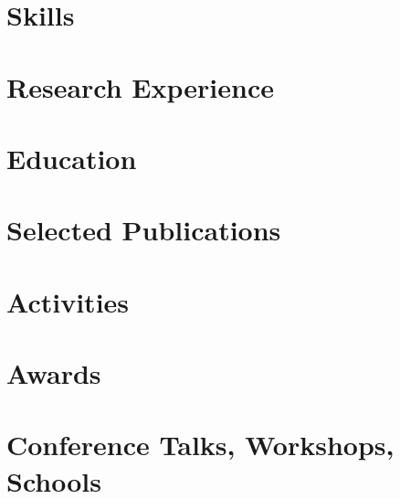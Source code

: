 \documentclass[letter,10pt]{article}
\begin{document}


\section{Skills}


\section{Research Experience}


\newpage

\section{Education}



\section{Selected Publications}


\section{Activities}


\section{Awards}


\section{Conference Talks, Workshops, Schools}

\end{document}
